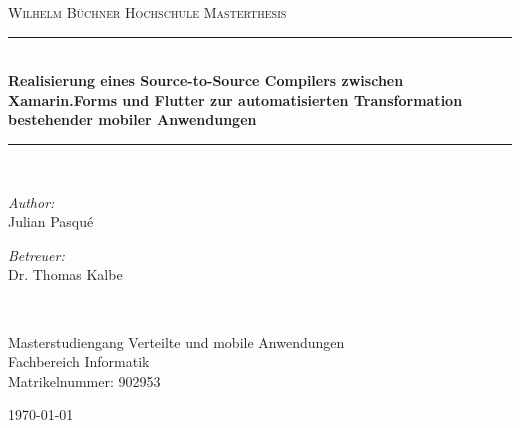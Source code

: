 \begin{titlepage}
\begin{center}
\newcommand{\HRule}{\rule{.9\linewidth}{.6pt}} %

\vspace*{.06\textheight}
{\scshape\LARGE Wilhelm Büchner Hochschule}\vspace{1.5cm} %
\textsc{\Large Masterthesis}\\[0.5cm] %

\HRule \\[0.4cm] %


\Large\textbf{ Realisierung eines Source-to-Source Compilers zwischen Xamarin.Forms und Flutter zur automatisierten Transformation bestehender mobiler 
Anwendungen}\par


\HRule \\[1.5cm] %
 
\begin{minipage}[t]{0.4\textwidth}
\begin{flushleft} \large
\emph{Author:}\\
Julian Pasqué %
\end{flushleft}
\end{minipage}
\begin{minipage}[t]{0.4\textwidth}
\begin{flushright} \large
\emph{Betreuer:} \\
Dr. Thomas Kalbe %
\end{flushright}
\end{minipage}\\[3cm]
 
\vfill


\large Masterstudiengang  Verteilte und mobile Anwendungen\\[0.8cm] %
\large Fachbereich Informatik\\[0.8cm] %
\large Matrikelnummer: 902953 \\[0.8cm] %
 
\vfill

{\large \today}\\[6cm] %
 
\vfill
\end{center}
\end{titlepage}